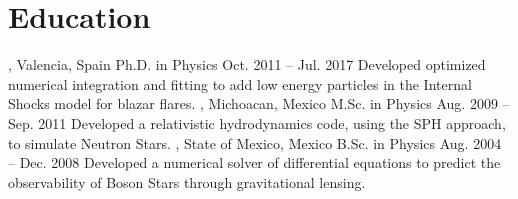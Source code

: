 \section{\large Education}

%
{\UVval, Valencia, Spain}%
{Ph.D. in Physics}%
{Oct. 2011 -- Jul. 2017}%
{}%
{Developed optimized numerical integration and fitting to add low energy particles in the Internal Shocks model for blazar flares.
}
\cventry{}%
{\UMSNHes, Michoacan, Mexico}%
{M.Sc. in Physics}%
{Aug. 2009 -- Sep. 2011}%
{}%
{Developed a relativistic hydrodynamics code, using the SPH approach, to simulate Neutron Stars.}
\cventry{}%
{\UAEMes, State of Mexico, Mexico}%
{B.Sc. in Physics}%
{Aug. 2004 -- Dec. 2008}
{}%
{Developed a numerical solver of differential equations to predict the observability of Boson Stars through gravitational lensing.}
